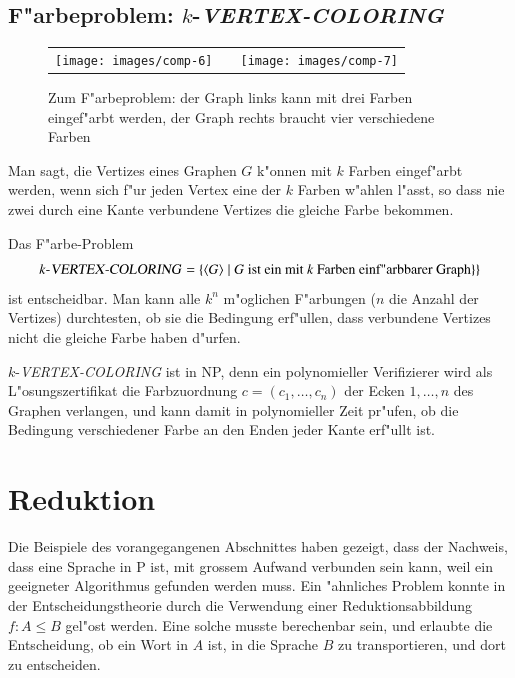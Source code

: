 \subsection{F"arbeproblem: $k$-\textsl{VERTEX-COLORING}}
\begin{figure}
\begin{center}
\begin{tabular}{ccc}
\texttt{[image: images/comp-6]}&
\qquad&\qquad
\texttt{[image: images/comp-7]}
\end{tabular}
\end{center}
\caption{Zum F"arbeproblem: der Graph links kann mit drei Farben
eingef"arbt werden, der Graph rechts braucht vier verschiedene Farben
\label{vertex-coloring-examples}}
\end{figure}%
Man sagt, die Vertizes eines Graphen $G$ k"onnen mit $k$ Farben
eingef"arbt werden, wenn sich f"ur jeden Vertex eine der $k$ Farben
w"ahlen l"asst, so dass nie zwei durch eine Kante verbundene Vertizes
die gleiche Farbe bekommen.

Das F"arbe-Problem 
\[
\text{$k$-\textsl{VERTEX-COLORING}}
=
\{
\langle G\rangle\;|\;
\text{$G$ ist ein mit $k$ Farben einf"arbbarer Graph}\}
\}
\]
ist entscheidbar. Man kann alle $k^n$ m"oglichen F"arbungen
($n$ die Anzahl der Vertizes) durchtesten, ob sie die Bedingung
erf"ullen, dass verbundene Vertizes nicht die gleiche Farbe haben
d"urfen.

$k$-\textsl{VERTEX-COLORING} ist in NP, denn ein polynomieller Verifizierer
wird als L"osungszertifikat die Farbzuordnung $c=(c_1,\dots,c_n)$ der
Ecken $1,\dots,n$ des Graphen verlangen, und kann damit in polynomieller
Zeit pr"ufen, ob die Bedingung verschiedener Farbe an den Enden
jeder Kante erf"ullt ist.

\section{Reduktion}
Die Beispiele des vorangegangenen Abschnittes haben gezeigt,
dass der Nachweis, dass eine Sprache in P ist, mit grossem
Aufwand verbunden sein kann, weil ein geeigneter Algorithmus
gefunden werden muss. Ein "ahnliches Problem konnte in der
Entscheidungstheorie durch die Verwendung einer Reduktionsabbildung
$f\colon A\le B$
gel"ost werden. Eine solche musste berechenbar sein, und erlaubte
die Entscheidung, ob ein Wort in $A$ ist, in die Sprache
$B$ zu transportieren, und dort zu entscheiden.


